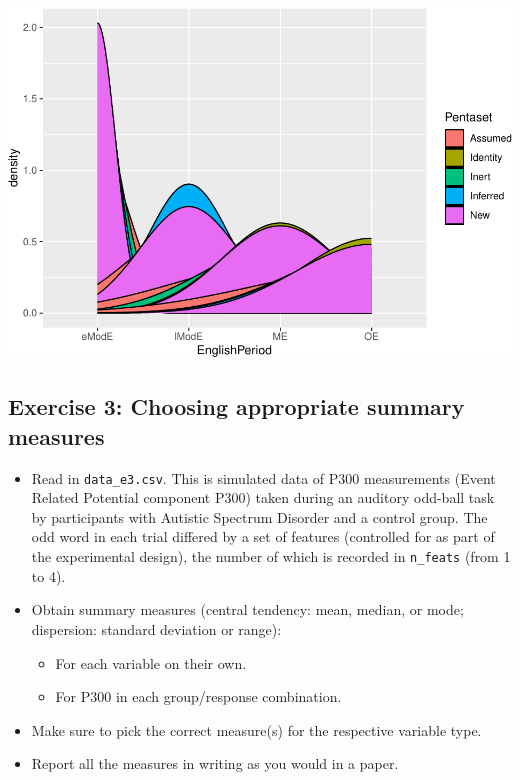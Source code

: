 \documentclass[
]{article}
\providecommand{\tightlist}{%
  \setlength{\itemsep}{0pt}\setlength{\parskip}{0pt}}
\begin{document}
\includegraphics{analysis_files/figure-latex/e2-2-1.pdf}

\newpage

\subsection{Exercise 3: Choosing appropriate summary
measures}\label{exercise-3-choosing-appropriate-summary-measures}

\begin{itemize}
\tightlist
\item
  Read in \texttt{data\_e3.csv}. This is simulated data of P300
  measurements (Event Related Potential component P300) taken during an
  auditory odd-ball task by participants with Autistic Spectrum Disorder
  and a control group. The odd word in each trial differed by a set of
  features (controlled for as part of the experimental design), the
  number of which is recorded in \texttt{n\_feats} (from 1 to 4).
\item
  Obtain summary measures (central tendency: mean, median, or mode;
  dispersion: standard deviation or range):

  \begin{itemize}
  \tightlist
  \item
    For each variable on their own.
  \item
    For P300 in each group/response combination.
  \end{itemize}
\item
  Make sure to pick the correct measure(s) for the respective variable
  type.
\item
  Report all the measures in writing as you would in a paper.
\end{itemize}
\end{document}
